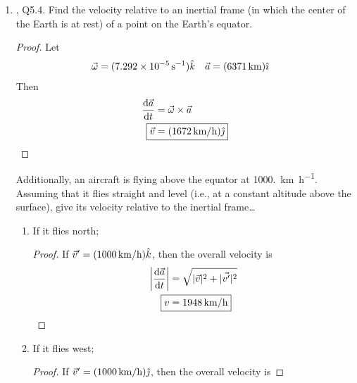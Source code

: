 \documentclass[../psets.tex]{subfiles}
\begin{document}
\begin{enumerate}
\begin{enumerate}
\begin{proof}
\begin{align*}
                &= 2\int_{r_\text{min}}^\infty\frac{b/r^2}{\sqrt{1-V(r)/E-b^2/r^2}}\dd{r}
            \end{align*}
            It follows that
            \begin{equation*}
                \boxed{\Theta = \pi-2\int_{r_\text{min}}^\infty\frac{b/r^2}{\sqrt{1-V(r)/E-b^2/r^2}}\dd{r}}
            \end{equation*}
        \end{proof}
    \end{enumerate}
    \item \textcite{bib:KibbleBerkshire}, Q5.4. Find the velocity relative to an inertial frame (in which the center of the Earth is at rest) of a point on the Earth's equator.
    \begin{proof}
        Let
        \begin{align*}
            \vec{\omega} &= (\SI{7.292e-5}{\per\second})\khat&
            \vec{a} &= (\SI{6371}{\kilo\meter})\ihat
        \end{align*}
        Then
        \begin{align*}
            \dv{\vec{a}}{t} &= \vec{\omega}\times\vec{a}\\
            \Aboxed{\vec{v} &= (\SI[per-mode=symbol]{1672}{\kilo\meter\per\hour})\jhat}
        \end{align*}
    \end{proof}
    Additionally, an aircraft is flying above the equator at \SI[per-mode=symbol]{1000.}{\kilo\meter\per\hour}. Assuming that it flies straight and level (i.e., at a constant altitude above the surface), give its velocity relative to the inertial frame\dots
    \begin{enumerate}
        \item If it flies north;
        \begin{proof}
            If $\vec{v}'=(\SI[per-mode=symbol]{1000}{\kilo\meter\per\hour})\khat$, then the overall velocity is
            \begin{align*}
                \left| \dv{\vec{a}}{t} \right| &= \sqrt{|\vec{v}|^2+|\vec{v'}|^2}\\
                \Aboxed{v &= \SI[per-mode=symbol]{1948}{\kilo\meter\per\hour}}
            \end{align*}
        \end{proof}
        \item If it flies west;
        \begin{proof}
            If $\vec{v}'=(\SI[per-mode=symbol]{1000}{\kilo\meter\per\hour})\jhat$, then the overall velocity is

\end{proof}
\end{enumerate}
\end{enumerate}
\end{document}

